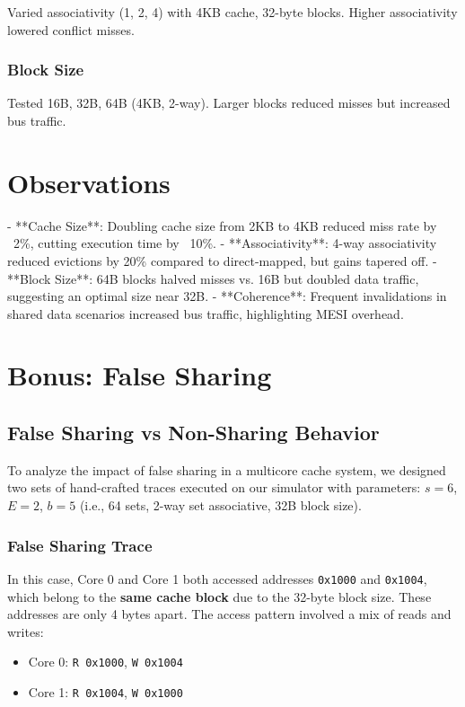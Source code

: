 \documentclass{article}
\begin{document}
Varied associativity (1, 2, 4) with 4KB cache, 32-byte blocks. Higher associativity lowered conflict misses.

\subsubsection{Block Size}

Tested 16B, 32B, 64B (4KB, 2-way). Larger blocks reduced misses but increased bus traffic.

\section{Observations}

- **Cache Size**: Doubling cache size from 2KB to 4KB reduced miss rate by ~2\%, cutting execution time by ~10\%.
- **Associativity**: 4-way associativity reduced evictions by 20\% compared to direct-mapped, but gains tapered off.
- **Block Size**: 64B blocks halved misses vs. 16B but doubled data traffic, suggesting an optimal size near 32B.
- **Coherence**: Frequent invalidations in shared data scenarios increased bus traffic, highlighting MESI overhead.

\section{Bonus: False Sharing}
\subsection{False Sharing vs Non-Sharing Behavior}

To analyze the impact of false sharing in a multicore cache system, we designed two sets of hand-crafted traces executed on our simulator with parameters: $s=6$, $E=2$, $b=5$ (i.e., 64 sets, 2-way set associative, 32B block size).

\subsubsection{False Sharing Trace}

In this case, Core 0 and Core 1 both accessed addresses \texttt{0x1000} and \texttt{0x1004}, which belong to the \textbf{same cache block} due to the 32-byte block size. These addresses are only 4 bytes apart. The access pattern involved a mix of reads and writes:

\begin{itemize}
    \item Core 0: \texttt{R 0x1000}, \texttt{W 0x1004}
    \item Core 1: \texttt{R 0x1004}, \texttt{W 0x1000}
\end{itemize}
\end{document}

